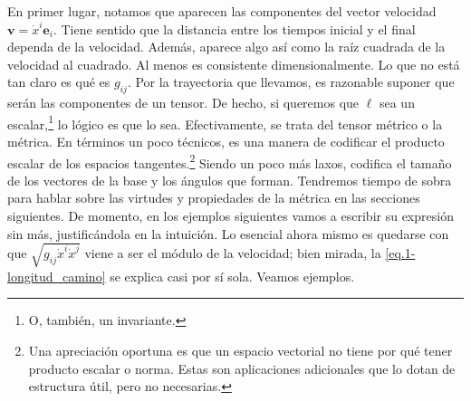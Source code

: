 En primer lugar, notamos que aparecen las componentes del vector velocidad \(\mathbf{v} = \dot{x}^i\mathbf{e}_i\). Tiene sentido que la distancia entre los tiempos inicial y el final dependa de la velocidad. Además, aparece algo así como la raíz cuadrada de la velocidad al cuadrado. Al menos es consistente dimensionalmente. Lo que no está tan claro es qué es \(g_{ij}\). Por la trayectoria que llevamos, es razonable suponer que serán las componentes de un tensor. De hecho, si queremos que \(\ell\) sea un escalar,\footnote{O, también, un invariante.} lo lógico es que lo sea. Efectivamente, se trata del tensor métrico o la métrica. En términos un poco técnicos, es una manera de codificar el producto escalar de los espacios tangentes.\footnote{Una apreciación oportuna es que un espacio vectorial no tiene por qué tener producto escalar o norma. Estas son aplicaciones adicionales que lo dotan de estructura útil, pero no necesarias.} Siendo un poco más laxos, codifica el tamaño de los vectores de la base y los ángulos que forman. Tendremos tiempo de sobra para hablar sobre las virtudes y propiedades de la métrica en las secciones siguientes. De momento, en los ejemplos siguientes vamos a escribir su expresión sin más, justificándola en la intuición. Lo esencial ahora mismo es quedarse con que \(\sqrt{g_{ij}\dot{x}^i\dot{x}^j}\) viene a ser el módulo de la velocidad; bien mirada, la \cref{eq.1-longitud_camino} se explica casi por sí sola. Veamos ejemplos.


